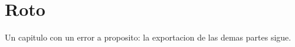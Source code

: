 \chapter{Roto}

Un capitulo con un error a proposito: la exportacion de las demas partes sigue.

\comandoQueNoExiste
